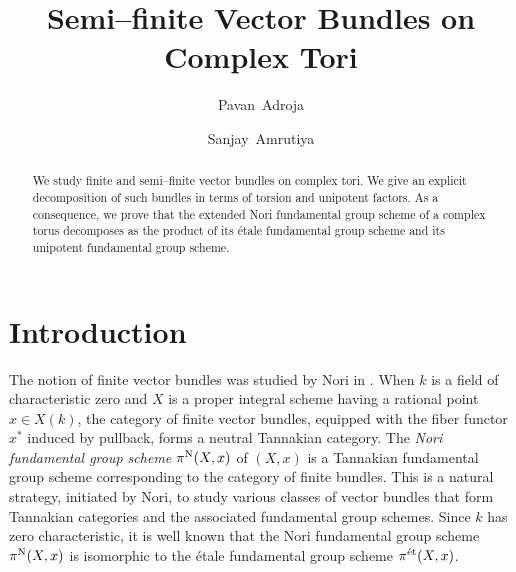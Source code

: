 \documentclass[12pt, reqno]{amsart}
\theoremstyle{plain}
\numberwithin{equation}{section}
\begin{document}
\baselineskip=15.5pt

\title{Semi--finite Vector Bundles on Complex Tori}
\author[P. Adroja]{Pavan~Adroja}
\address{Department of Mathematics, IIT Gandhinagar,
 Near Village Palaj, Gandhinagar - 382055, India}
\author[S. Amrutiya]{Sanjay~Amrutiya}
\address{Department of Mathematics, IIT Gandhinagar,
 Near Village Palaj, Gandhinagar - 382055, India}
\date{}

\begin{abstract}
We study finite and semi--finite vector bundles on complex tori. We give an explicit decomposition of such bundles in terms of torsion and unipotent factors. As a consequence, we prove that the extended Nori fundamental group scheme of a complex torus decomposes as the product of its \'etale fundamental group scheme and its unipotent fundamental group scheme.
\end{abstract}

\maketitle
\section{Introduction}

The notion of finite vector bundles was studied by Nori in \cite{No}. When $k$ is a field of characteristic zero and $X$ is a proper integral scheme having a rational point $x\in X(k)$, the category of finite vector bundles, equipped with the fiber functor $x^*$ induced by pullback, forms a neutral Tannakian category. The \emph{Nori fundamental group scheme} $\pi^{\rm N}(X,x)$ of $(X,x)$ is a Tannakian fundamental group scheme corresponding to the category of finite bundles. This is a natural strategy, initiated by Nori, to study various classes of vector bundles that form Tannakian categories and the associated fundamental group schemes. Since $k$ has zero characteristic, it is well known that the Nori fundamental group scheme $\pi^{\rm N}(X,x)$ is isomorphic to the \'etale fundamental group scheme $\pi^{\rm \acute{e}t}(X,x)$.
\end{document}
